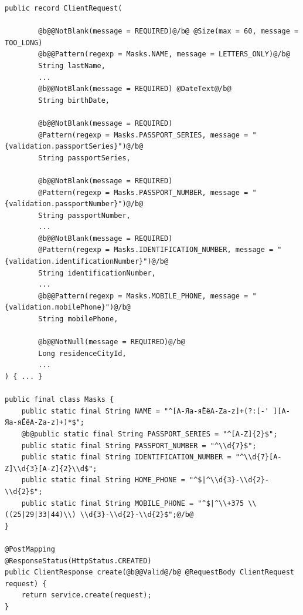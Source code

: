 \documentclass[14pt,a4paper]{extarticle}
\begin{document}
\begin{lstlisting}[style=java, style=marked, caption={Серверная проверка: запись \texttt{ClientRequest} и маски \texttt{Masks}}, label={lst:server-validation}]
public record ClientRequest(

        @b@@NotBlank(message = REQUIRED)@/b@ @Size(max = 60, message = TOO_LONG)
        @b@@Pattern(regexp = Masks.NAME, message = LETTERS_ONLY)@/b@
        String lastName,
        ...
        @b@@NotBlank(message = REQUIRED) @DateText@/b@
        String birthDate,

        @b@@NotBlank(message = REQUIRED)
        @Pattern(regexp = Masks.PASSPORT_SERIES, message = "{validation.passportSeries}")@/b@
        String passportSeries,

        @b@@NotBlank(message = REQUIRED)
        @Pattern(regexp = Masks.PASSPORT_NUMBER, message = "{validation.passportNumber}")@/b@
        String passportNumber,
        ...
        @b@@NotBlank(message = REQUIRED)
        @Pattern(regexp = Masks.IDENTIFICATION_NUMBER, message = "{validation.identificationNumber}")@/b@
        String identificationNumber,
        ...
        @b@@Pattern(regexp = Masks.MOBILE_PHONE, message = "{validation.mobilePhone}")@/b@
        String mobilePhone,

        @b@@NotNull(message = REQUIRED)@/b@
        Long residenceCityId,
        ...
) { ... }

public final class Masks {
    public static final String NAME = "^[А-Яа-яЁёA-Za-z]+(?:[-' ][А-Яа-яЁёA-Za-z]+)*$";
    @b@public static final String PASSPORT_SERIES = "^[A-Z]{2}$";
    public static final String PASSPORT_NUMBER = "^\\d{7}$";
    public static final String IDENTIFICATION_NUMBER = "^\\d{7}[A-Z]\\d{3}[A-Z]{2}\\d$";
    public static final String HOME_PHONE = "^$|^\\d{3}-\\d{2}-\\d{2}$";
    public static final String MOBILE_PHONE = "^$|^\\+375 \\((25|29|33|44)\\) \\d{3}-\\d{2}-\\d{2}$";@/b@
}

@PostMapping
@ResponseStatus(HttpStatus.CREATED)
public ClientResponse create(@b@@Valid@/b@ @RequestBody ClientRequest request) {
    return service.create(request);
}
\end{lstlisting}
\end{document}
